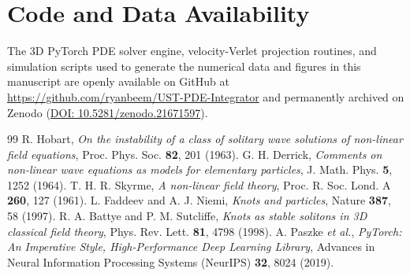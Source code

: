 \documentclass[11pt,a4paper]{article}
\begin{document}
	\section*{Code and Data Availability}
	The 3D PyTorch PDE solver engine, velocity-Verlet projection routines, and simulation scripts used to generate the numerical data and figures in this manuscript are openly available on GitHub at \url{https://github.com/ryanbeem/UST-PDE-Integrator} and permanently archived on Zenodo (\href{https://doi.org/10.5281/zenodo.21671597}{DOI: 10.5281/zenodo.21671597}).
	
	
	\begin{thebibliography}{99}
		 R. Hobart, \textit{On the instability of a class of solitary wave solutions of non-linear field equations}, Proc. Phys. Soc. \textbf{82}, 201 (1963).
		 G. H. Derrick, \textit{Comments on non-linear wave equations as models for elementary particles}, J. Math. Phys. \textbf{5}, 1252 (1964).
		 T. H. R. Skyrme, \textit{A non-linear field theory}, Proc. R. Soc. Lond. A \textbf{260}, 127 (1961).
		 L. Faddeev and A. J. Niemi, \textit{Knots and particles}, Nature \textbf{387}, 58 (1997).
		 R. A. Battye and P. M. Sutcliffe, \textit{Knots as stable solitons in 3D classical field theory}, Phys. Rev. Lett. \textbf{81}, 4798 (1998).
		 A. Paszke \textit{et al.}, \textit{PyTorch: An Imperative Style, High-Performance Deep Learning Library}, Advances in Neural Information Processing Systems (NeurIPS) \textbf{32}, 8024 (2019).
	\end{thebibliography}
	
\end{document}
